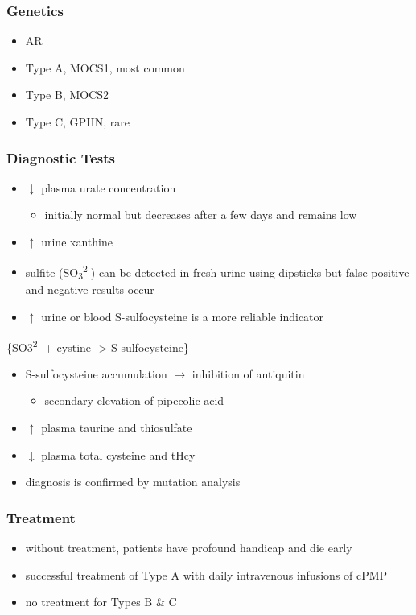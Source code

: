 \documentclass{scrartcl}
\begin{document}
\subsubsection{Genetics}
\label{sec:org4f93499}
\begin{itemize}
\item AR
\item Type A, MOCS1, most common
\item Type B, MOCS2
\item Type C, GPHN, rare
\end{itemize}

\subsubsection{Diagnostic Tests}
\label{sec:org5328757}
\begin{itemize}
\item \(\downarrow\) plasma urate concentration
\begin{itemize}
\item initially normal but decreases after a few days and remains low
\end{itemize}
\item \(\uparrow\) urine xanthine
\item sulfite (SO\textsubscript{3}\textsuperscript{2-}) can be detected in fresh urine using dipsticks but false
positive and negative results occur
\item \(\uparrow\) urine or blood S-sulfocysteine is a more reliable indicator
\end{itemize}
\ce\{SO3\textsuperscript{2-} + cystine -> S-sulfocysteine\}
\begin{itemize}
\item S-sulfocysteine accumulation \(\to\) inhibition of antiquitin
\begin{itemize}
\item secondary elevation of pipecolic acid
\end{itemize}
\end{itemize}
\begin{itemize}
\item \(\uparrow\) plasma taurine and thiosulfate
\item \(\downarrow\) plasma total cysteine and tHcy
\item diagnosis is confirmed by mutation analysis
\end{itemize}

\subsubsection{Treatment}
\label{sec:orgc5ff606}
\begin{itemize}
\item without treatment, patients have profound handicap and die early
\item successful treatment of Type A with daily intravenous infusions of
cPMP
\item no treatment for Types B \& C
\end{itemize}
\end{document}
